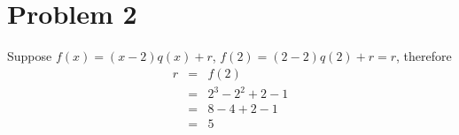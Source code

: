 \section*{Problem 2}
Suppose $ f(x) = (x-2)q(x) + r $, $ f(2) = (2-2)q(2) + r = r $, therefore
\begin{eqnarray*}
  r &=& f(2)              \\
    &=& 2^3 - 2^2 + 2 - 1 \\
    &=& 8 - 4 + 2 - 1     \\
    &=& 5
\end{eqnarray*}
